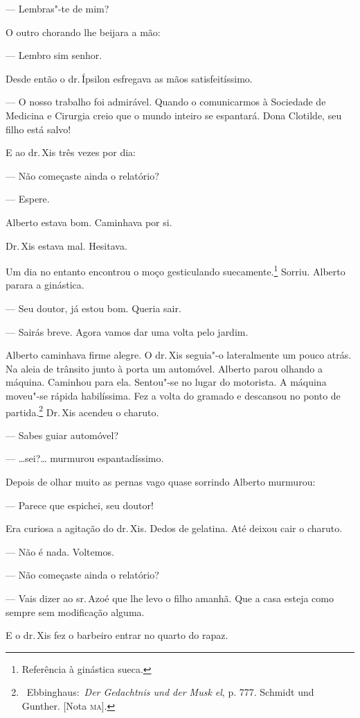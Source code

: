 --- Lembras"-te de mim?

O outro chorando lhe beijara a mão:

--- Lembro sim senhor.

Desde então o dr.\,Ípsilon esfregava as mãos satisfeitíssimo.

--- O nosso trabalho foi admirável. Quando o comunicarmos à Sociedade de
Medicina e Cirurgia creio que o mundo inteiro se espantará. Dona
Clotilde, seu filho está salvo!

E ao dr.\,Xis três vezes por dia:

--- Não começaste ainda o relatório?

--- Espere.

Alberto estava bom. Caminhava por si.

Dr.\,Xis estava mal. Hesitava.

Um dia no entanto encontrou o moço gesticulando suecamente.\footnote{Referência
  à ginástica sueca.} Sorriu. Alberto parara a ginástica.

--- Seu doutor, já estou bom. Queria sair.

--- Sairás breve. Agora vamos dar uma volta pelo jardim.

Alberto caminhava firme alegre. O dr.\,Xis seguia"-o lateralmente um pouco
atrás. Na aleia de trânsito junto à porta um automóvel. Alberto parou
olhando a máquina. Caminhou para ela. Sentou"-se no lugar do motorista. A
máquina moveu"-se rápida habilíssima. Fez a volta do gramado e descansou
no ponto de partida.\footnote{~Ebbinghaus:~\emph{Der Gedachtnis und der
  Musk el}, p. 777. Schmidt und Gunther. {[}Nota \textsc{ma}{]}.} Dr.\,Xis
acendeu o charuto.

--- Sabes guiar automóvel?

--- \ldots{}sei?\ldots{} murmurou espantadíssimo.

Depois de olhar muito as pernas vago quase sorrindo Alberto murmurou:

--- Parece que espichei, seu doutor!

Era curiosa a agitação do dr.\,Xis. Dedos de gelatina. Até deixou cair o
charuto.

--- Não é nada. Voltemos.

--- Não começaste ainda o relatório?

--- Vais dizer ao sr.\,Azoé que lhe levo o filho amanhã. Que a casa
esteja como sempre sem modificação alguma.

E o dr.\,Xis fez o barbeiro entrar no quarto do rapaz.

